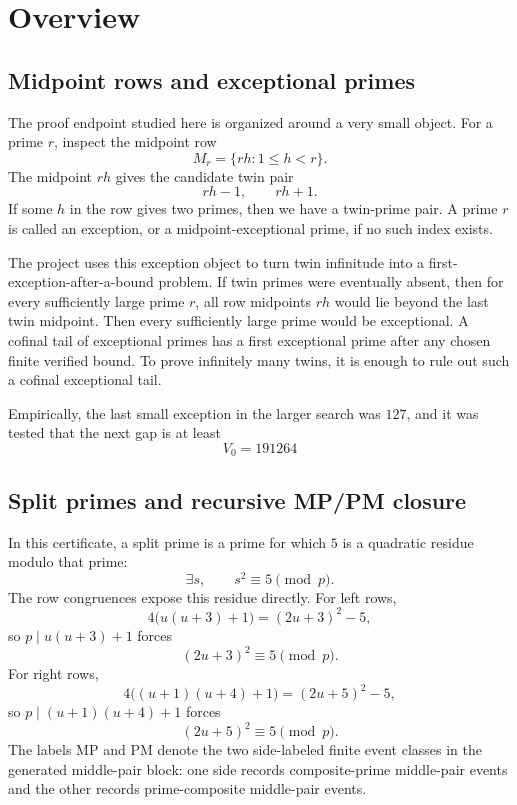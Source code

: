 \documentclass[11pt]{article}
\begin{document}
\clearpage
\tableofcontents
\clearpage

\section{Overview}
\noindent

\subsection{Midpoint rows and exceptional primes}

The proof endpoint studied here is organized around a very small object.
For a prime \(r\), inspect the midpoint row
\[
  M_r=\{rh:1\le h<r\}.
\]
The midpoint \(rh\) gives the candidate twin pair
\[
  rh-1,\qquad rh+1.
\]
If some \(h\) in the row gives two primes, then we have a twin-prime pair.
A prime \(r\) is called an exception, or a midpoint-exceptional prime, if
no such index exists.

The project uses this exception object to turn twin infinitude into a
first-exception-after-a-bound problem.  If twin primes were eventually absent,
then for every sufficiently large prime \(r\), all row midpoints \(rh\) would
lie beyond the last twin midpoint.  Then every sufficiently large prime would
be exceptional.  A cofinal tail of exceptional primes has a first exceptional
prime after any chosen finite verified bound.  To prove infinitely many twins,
it is enough to rule out such a cofinal exceptional tail.

Empirically, the last small exception in the larger search was \(127\), and it
was tested that the next gap is at least
\[
  V_0=191264
\]

\subsection{Split primes and recursive MP/PM closure}

In this certificate, a split prime is a prime for which \(5\) is a quadratic
residue modulo that prime:
\[
  \exists s,\qquad s^2\equiv5\pmod p.
\]
The row congruences expose this residue directly.  For left rows,
\[
  4\bigl(u(u+3)+1\bigr)=(2u+3)^2-5,
\]
so \(p\mid u(u+3)+1\) forces
\[
  (2u+3)^2\equiv5\pmod p.
\]
For right rows,
\[
  4\bigl((u+1)(u+4)+1\bigr)=(2u+5)^2-5,
\]
so \(p\mid (u+1)(u+4)+1\) forces
\[
  (2u+5)^2\equiv5\pmod p.
\]
The labels MP and PM denote the two side-labeled finite event classes in the
generated middle-pair block: one side records composite-prime middle-pair events
and the other records prime-composite middle-pair events.
\end{document}
